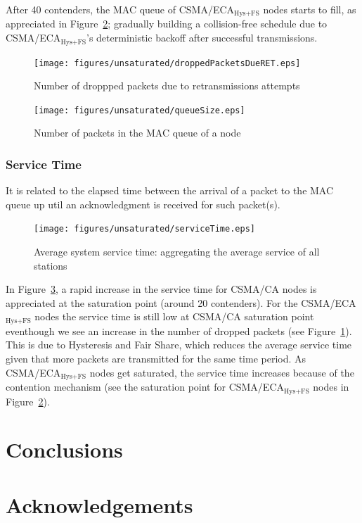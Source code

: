 \documentclass[a4paper,journal]{IEEEtran}
\begin{document}
	After 40 contenders, the MAC queue of CSMA/ECA$_{\text{Hys+FS}}$ nodes starts to fill, as appreciated in Figure~\ref{fig:MacQ}; gradually building a collision-free schedule due to CSMA/ECA$_{\text{Hys+FS}}$'s deterministic backoff after successful transmissions.
	
   	\begin{figure}[htbp]
		\centering
		\texttt{[image: figures/unsaturated/droppedPacketsDueRET.eps]}
		\caption{Number of droppped packets due to retransmissions attempts}
		\label{fig:droppedDueToRET}
	\end{figure}
	
	 \begin{figure}[htbp]
		\centering
		\texttt{[image: figures/unsaturated/queueSize.eps]}
		\caption{Number of packets in the MAC queue of a node}
		\label{fig:MacQ}
	\end{figure}
	
	\subsubsection{Service Time}
	It is related to the elapsed time between the arrival of a packet to the MAC queue up util an acknowledgment is received for such packet(s).
	
	\begin{figure}[htbp]
		\centering
		\texttt{[image: figures/unsaturated/serviceTime.eps]}
		\caption{Average system service time: aggregating the average service of all stations}
		\label{fig:serviceTime}
	\end{figure}
	
	In Figure~\ref{fig:serviceTime}, a rapid increase in the service time for CSMA/CA nodes is appreciated at the saturation point (around 20 contenders). For the CSMA/ECA$_{\text{Hys+FS}}$ nodes the service time is still low at CSMA/CA saturation point eventhough we see an increase in the number of dropped packets (see Figure~\ref{fig:droppedDueToRET}). This is due to Hysteresis and Fair Share, which reduces the average service time given that more packets are transmitted for the same time period. As CSMA/ECA$_{\text{Hys+FS}}$ nodes get saturated, the service time increases because of the contention mechanism (see the saturation point for CSMA/ECA$_{\text{Hys+FS}}$ nodes in Figure~\ref{fig:MacQ}).\\	


\section{Conclusions}\label{conclusions}
\section{Acknowledgements}




\end{document}
